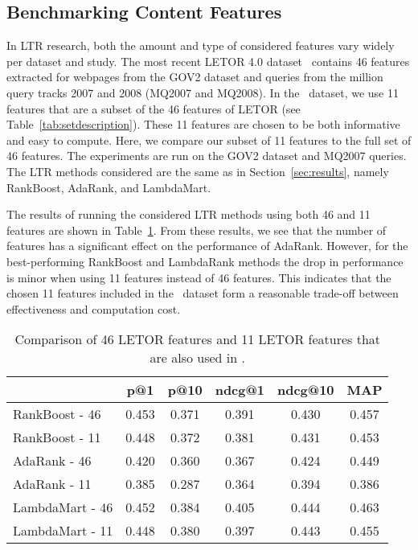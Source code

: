 \subsection{Benchmarking Content Features} \label{sec:contentfeatures}
In \ac{LTR} research, both the amount and type of considered features vary widely per dataset and study.
The most recent LETOR 4.0 dataset~\cite{Qin2013:Introducing} contains 46 features extracted for webpages from the GOV2 dataset and queries from the million query tracks 2007 and 2008 (MQ2007 and MQ2008).
In the \datasetname~dataset, we use 11 features that are a subset of the 46 features of LETOR (see Table~\ref{tab:setdescription}).
These 11 features are chosen to be both informative and easy to compute.
Here, we compare our subset of 11 features to the full set of 46 features.
The experiments are run on the GOV2 dataset and MQ2007 queries.
The \ac{LTR} methods considered are the same as in Section~\ref{sec:results}, namely RankBoost, AdaRank, and LambdaMart.

The results of running the considered \ac{LTR} methods using both 46 and 11 features are shown in Table~\ref{tab:11vs46}.
From these results, we see that the number of features has a significant effect on the performance of AdaRank.
However, for the best-performing RankBoost and LambdaRank methods the drop in performance is minor when using 11 features instead of 46 features.
This indicates that the chosen 11 features included in the \datasetname~dataset form a reasonable trade-off between effectiveness and computation cost.

\begin{table}[h]
\caption{Comparison of 46 LETOR features and 11 LETOR features that are also used in \datasetname.}
\label{tab:11vs46}
\centering
\begin{tabular}{lccccc}
\toprule
           & p@1  & p@10   & ndcg@1 & ndcg@10 & MAP \\ 
\midrule
RankBoost - 46 & 0.453 & 0.371 & 0.391 & 0.430  & 0.457 \\
RankBoost - 11 & 0.448 & 0.372 & 0.381  & 0.431   & 0.453 \\
\midrule
AdaRank - 46  & 0.420 & 0.360 & 0.367 & 0.424  & 0.449 \\
AdaRank - 11  & 0.385 & 0.287 & 0.364  & 0.394   & 0.386 \\ 
\midrule
LambdaMart - 46 & 0.452 & 0.384 & 0.405 & 0.444  & 0.463 \\
LambdaMart - 11 & 0.448 & 0.380 & 0.397  & 0.443   & 0.455 \\
\bottomrule
\end{tabular}
\end{table}



